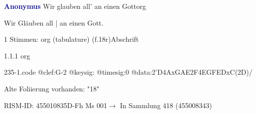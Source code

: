 \documentclass[twocolumn]{book}
\begin{document}
\par \vspace{7pt} \textcolor{darkblue}{\textbf{Anonymus  }}\hfillplus{\textbf{[235]}}\newline Wir glauben all' an einen Gott\newline org
\par \begin{itshape}[f.18r, at left:] Wir Gläuben all | an einen Gott.\end{itshape} 
\par \textcolor{darkblue}{}  1 Stimmen: org (tabulature)  (f.18r)\newline Abschrift
\par 1.1.1  org  
\begin{filecontents*}{235-1.code}
@clef:G-2
@keysig:
@timesig:0
@data:2'D4AxGAE2F4EGFEDxC(2D)/
\end{filecontents*}
\newline
%
\par Alte Foliierung vorhanden: "18"
\par RISM-ID: 455010835\newline D-Fh  Ms 001\newline $\rightarrow$ In Sammlung 418 (455008343)
      
\end{document}
